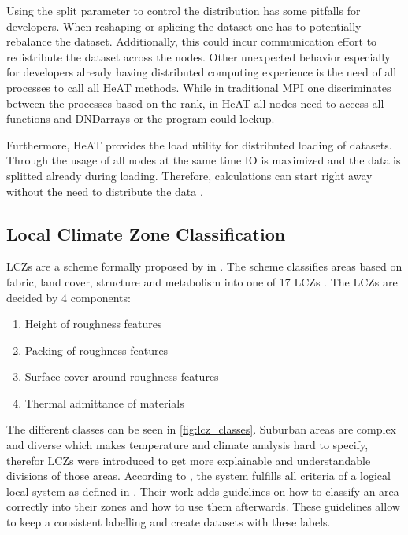 Using the split parameter to control the distribution has some pitfalls for developers.
When reshaping or splicing the dataset one has to potentially rebalance the dataset. Additionally, this could incur communication effort
to redistribute the dataset across the nodes.
Other unexpected behavior especially for developers already having distributed computing experience is the need of all processes to call all \gls{HeAT} methods.
While in traditional \gls{MPI} one discriminates between the processes based on the rank, in \gls{HeAT} all nodes need to access all functions and \glspl{DNDarray} or the
program could lockup.

Furthermore, \gls{HeAT} provides the load utility for distributed loading of datasets. Through the usage of all nodes at the same time \gls{IO} is maximized and the data
is splitted already during loading. Therefore, calculations can start right away without the need to distribute the data
\cite{krajsek_helmholtz_nodate}.


\subsection{Local Climate Zone Classification}
\label{subsec:local_climate_zone_classification}

\glspl{LCZ} are a scheme formally proposed by \citeauthor{stewart_local_2012} in \cite{stewart_local_2012}. The scheme classifies areas based on fabric, land cover, structure
and metabolism into one of 17 \gls{LCZ}s \cite{xue_applications_2020}.
The \gls{LCZ}s are decided by 4 components:
\begin{enumerate}
  \item Height of roughness features
  \item Packing of roughness features
  \item Surface cover around roughness features
  \item Thermal admittance of materials
\end{enumerate}
The different classes can be seen in \cref{fig:lcz_classes}.
Suburban areas are complex and diverse which makes temperature and climate analysis hard to specify, therefor
\glspl{LCZ} were introduced to get more explainable and understandable divisions of those areas.
According to \citeauthor{stewart_local_2012}, the system fulfills all criteria of a logical local system as defined in \cite{grigg_logic_1965}.
Their work adds guidelines on how to classify an area correctly into their zones and how to use them afterwards.
These guidelines allow to keep a consistent labelling and create datasets with these labels.


